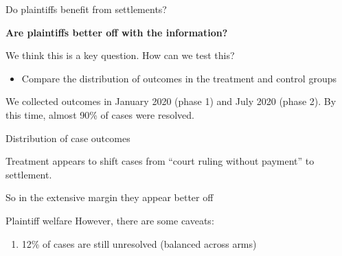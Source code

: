 \documentclass[9pt]{beamer}
\begin{document}
\begin{frame}{Do plaintiffs benefit from settlements?}
    
    \textbf{Are plaintiffs better off with the information?}
    
    \vspace{6mm}
    We think this is a key question. How can we test this?
    \vspace{3mm}
    \begin{itemize}
        \item Compare the distribution of outcomes in the treatment and control groups
    \end{itemize}
    
    
    \vspace{6mm}
    We collected outcomes in January 2020 (phase 1) and July 2020 (phase 2). By this time, almost 90\% of cases were resolved.
    
\end{frame}

\begin{frame}{Distribution of case outcomes}

Treatment appears to shift cases from ``court ruling \alert{without payment}'' to settlement.

\vspace{4mm}
     \begin{table}[H]
    \label{outcomes}
    \begin{center}
     \resizebox{0.725\columnwidth}{!}{\scriptsize{}}
        \end{center}
\end{table}

\vspace{.1in}
So in the extensive margin they appear better off
\end{frame}


 
 \begin{frame}{Plaintiff welfare}
    However, there are some caveats:
    \begin{enumerate}
    \vspace{2mm}
        \item 12\% of cases are still unresolved  (balanced across arms)
    \end{enumerate}
 \end{frame}
 
\end{document}
